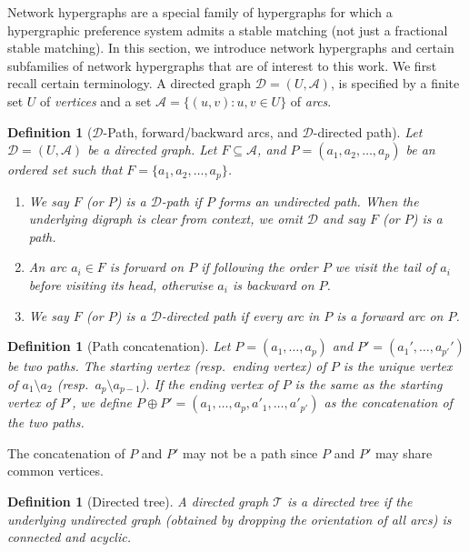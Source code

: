 \documentclass[11pt]{article}
\newtheorem{definition}[theorem]{Definition}
\begin{document}
Network hypergraphs are a special family of hypergraphs for which a hypergraphic preference system admits a stable matching (not just a  fractional stable matching). In this section, we introduce network hypergraphs and certain subfamilies of network hypergraphs that are of interest to this work. We first recall certain terminology. A directed graph $\mathcal{D}=(U,\mathcal{A})$, is specified by a finite set $U$ of \emph{vertices} and a set $\mathcal{A}=\{(u,v):u,v\in U\}$ of \emph{arcs}.
\begin{definition}[$\mathcal{D}$-Path, forward/backward arcs, and $\mathcal{D}$-directed path]\label{def:Mono-Path}
Let $\mathcal{D}=(U,\mathcal{A})$ be a directed graph. Let $F\subseteq \mathcal{A}$, and $P=(a_1,a_2,\dots,a_p)$ be an ordered set such that $F=\{a_1,a_2,\dots,a_p\}$.
\begin{enumerate}
    \item We say $F$ (or $P$) is a \emph{$\mathcal{D}$-path} if $P$ forms an undirected path. When the underlying digraph is clear from context, we omit $\mathcal{D}$ and say $F$ (or $P$) is a path.
    \item An arc $a_i\in F$ is \emph{forward} on $P$ if following the order $P$ we visit the tail of $a_i$ before visiting its head, otherwise $a_i$ is \emph{backward} on $P$.
    \item We say $F$ (or $P$) is a \emph{$\mathcal{D}$-directed path} if every arc in $P$ is a forward arc on $P$.
\end{enumerate}
\end{definition}


\begin{definition}[Path concatenation]\label{def:walk}
Let $P=(a_1,\dots,a_p)$ and $P'=(a_1',\dots,a_{p'}')$ be two paths. The starting vertex (resp.~ending vertex) of $P$ is the unique vertex of $a_1\setminus a_2$ (resp.~$a_p\setminus a_{p-1}$). If the ending vertex of $P$ is the same as the starting vertex of $P'$, we define $P\oplus P'=(a_1,\dots,a_p,a'_1,\dots,a'_{p'})$ as the \emph{concatenation} of the two paths.
\end{definition}

The concatenation of $P$ and $P'$ may not be a path since $P$ and $P'$ may share common vertices.

\begin{definition}[Directed tree]\label{def:direct-tree}
    A directed graph $\mathcal{T}$ is a \emph{directed tree} if the underlying undirected graph (obtained by dropping the orientation of all arcs) is connected and acyclic. 
\end{definition}
\end{document}
